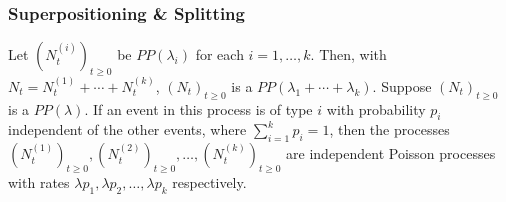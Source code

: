 \subsubsection*{Superpositioning \& Splitting}
 Let $(N^{(i)}_t)_{t \ge 0}$ be $PP(\lambda_i)$ for each $i = 1, \ldots, k$. Then, with $N_t = N^{(1)}_t + \cdots + N^{(k)}_t$, $(N_t)_{t \ge 0}$ is a $PP(\lambda_1 + \cdots + \lambda_k)$.
 Suppose $(N_t)_{t \ge 0}$ is a $PP(\lambda)$. If an event in this process is of type $i$ with probability $p_i$ independent of the other events, where $\sum^k_{i=1} p_i = 1$, then the processes $(N^{(1)}_t)_{t \ge 0}, (N^{(2)}_t)_{t \ge 0}, \ldots, (N^{(k)}_t)_{t \ge 0}$ are independent Poisson processes with rates $\lambda p_1, \lambda p_2, \ldots, \lambda p_k$ respectively.